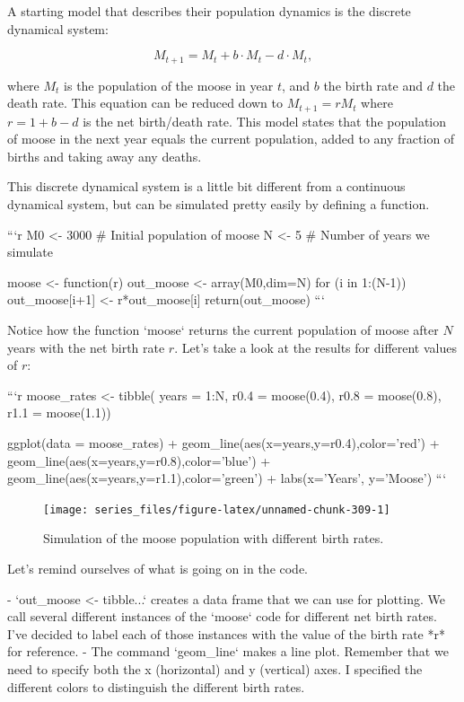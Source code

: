 \documentclass[
]{book}
\theoremstyle{definition}
\theoremstyle{definition}
\theoremstyle{definition}
\theoremstyle{remark}
\begin{document}
A starting model that describes their population dynamics is the discrete dynamical system:

\begin{equation}
M_{t+1} = M_{t} + b \cdot M_{t} - d \cdot M_{t}, \label{eq:moose}
\end{equation}

where $M_{t}$ is the population of the moose in year $t$, and $b$ the birth rate and $d$ the death rate.  This equation can be reduced down to $M_{t+1}=r M_{t}$ where $r=1+b-d$ is the net birth/death rate.  This model states that the population of moose in the next year equals the current population, added to any fraction of births and taking away any deaths.

This discrete dynamical system is a little bit different from a continuous dynamical system, but can be simulated pretty easily by defining a function.  


```r
M0 <- 3000  # Initial population of moose
N <- 5  # Number of years we simulate

moose <- function(r) {
  out_moose <- array(M0,dim=N)
  for (i in 1:(N-1)) {
    out_moose[i+1] <- r*out_moose[i]
  }
  return(out_moose)
}
```

Notice how the function `moose` returns the current population of moose after $N$ years with the net birth rate $r$.  Let's take a look at the results for different values of $r$:

```r
moose_rates <- tibble( years = 1:N,
                     r0.4 = moose(0.4),
                     r0.8 = moose(0.8),
                     r1.1 = moose(1.1))


ggplot(data = moose_rates) +
  geom_line(aes(x=years,y=r0.4),color='red') +
  geom_line(aes(x=years,y=r0.8),color='blue') +
  geom_line(aes(x=years,y=r1.1),color='green') +
  labs(x='Years',
         y='Moose')
```

\begin{figure}

{\centering \texttt{[image: series\_files/figure-latex/unnamed-chunk-309-1]} 

}

\caption{Simulation of the moose population with different birth rates.}\label{fig:unnamed-chunk-309}
\end{figure}
Let's remind ourselves of what is going on in the code.

- `out_moose <- tibble...` creates a data frame that we can use for plotting.  We call several different instances of the `moose` code for different net birth rates.  I've decided to label each of those instances with the value of the birth rate *r* for reference.
- The command `geom_line` makes a line plot.  Remember that we need to specify both the x (horizontal) and y (vertical) axes.  I specified the different colors to distinguish the different birth rates.
\end{document}
